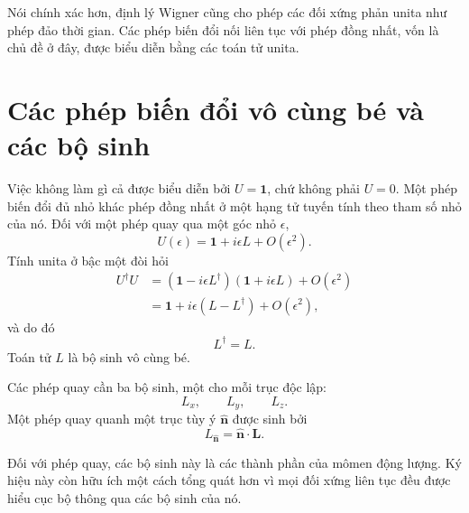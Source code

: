 Nói chính xác hơn, định lý Wigner cũng cho phép các đối xứng phản unita như phép đảo thời gian. Các phép biến đổi nối liên tục với phép đồng nhất, vốn là chủ đề ở đây, được biểu diễn bằng các toán tử unita. 

\section{Các phép biến đổi vô cùng bé và các bộ sinh}

Việc không làm gì cả được biểu diễn bởi \(U=\mathbf 1\), chứ không phải \(U=0\). Một phép biến đổi đủ nhỏ khác phép đồng nhất ở một hạng tử tuyến tính theo tham số nhỏ của nó. Đối với một phép quay qua một góc nhỏ \(\epsilon\),
\begin{equation}
U(\epsilon)=\mathbf 1+i\epsilon L+O(\epsilon^2).
\end{equation}
Tính unita ở bậc một đòi hỏi
\begin{align}
U^\dagger U
&=\left(\mathbf 1-i\epsilon L^\dagger\right)
  \left(\mathbf 1+i\epsilon L\right)+O(\epsilon^2)\\
&=\mathbf 1+i\epsilon(L-L^\dagger)+O(\epsilon^2),
\end{align}
và do đó
\begin{equation}
L^\dagger=L.
\end{equation}
Toán tử \(L\) là bộ sinh vô cùng bé.

Các phép quay cần ba bộ sinh, một cho mỗi trục độc lập:
\begin{equation}
L_x,\qquad L_y,\qquad L_z.
\end{equation}
Một phép quay quanh một trục tùy ý \(\widehat{\bm n}\) được sinh bởi
\begin{equation}
L_{\widehat{\bm n}}=\widehat{\bm n}\cdot\bm L.
\end{equation}

\begin{classroomqa}
\end{classroomqa}

Đối với phép quay, các bộ sinh này là các thành phần của mômen động lượng. Ký hiệu này còn hữu ích một cách tổng quát hơn vì mọi đối xứng liên tục đều được hiểu cục bộ thông qua các bộ sinh của nó.

